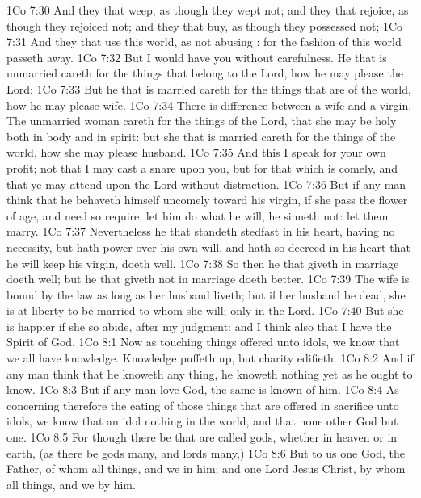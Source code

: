\vs 1Co 7:30 And they that weep, as though they wept not; and they that rejoice, as though they rejoiced not; and they that buy, as though they possessed not;
\vs 1Co 7:31 And they that use this world, as not abusing : for the fashion of this world passeth away.
\vs 1Co 7:32 But I would have you without carefulness. He that is unmarried careth for the things that belong to the Lord, how he may please the Lord:
\vs 1Co 7:33 But he that is married careth for the things that are of the world, how he may please  wife.
\vs 1Co 7:34 There is difference  between a wife and a virgin. The unmarried woman careth for the things of the Lord, that she may be holy both in body and in spirit: but she that is married careth for the things of the world, how she may please  husband.
\vs 1Co 7:35 And this I speak for your own profit; not that I may cast a snare upon you, but for that which is comely, and that ye may attend upon the Lord without distraction.
\vs 1Co 7:36 But if any man think that he behaveth himself uncomely toward his virgin, if she pass the flower of  age, and need so require, let him do what he will, he sinneth not: let them marry.
\vs 1Co 7:37 Nevertheless he that standeth stedfast in his heart, having no necessity, but hath power over his own will, and hath so decreed in his heart that he will keep his virgin, doeth well.
\vs 1Co 7:38 So then he that giveth  in marriage doeth well; but he that giveth  not in marriage doeth better.
\vs 1Co 7:39 The wife is bound by the law as long as her husband liveth; but if her husband be dead, she is at liberty to be married to whom she will; only in the Lord.
\vs 1Co 7:40 But she is happier if she so abide, after my judgment: and I think also that I have the Spirit of God.
\vs 1Co 8:1 Now as touching things offered unto idols, we know that we all have knowledge. Knowledge puffeth up, but charity edifieth.
\vs 1Co 8:2 And if any man think that he knoweth any thing, he knoweth nothing yet as he ought to know.
\vs 1Co 8:3 But if any man love God, the same is known of him.
\vs 1Co 8:4 As concerning therefore the eating of those things that are offered in sacrifice unto idols, we know that an idol  nothing in the world, and that  none other God but one.
\vs 1Co 8:5 For though there be that are called gods, whether in heaven or in earth, (as there be gods many, and lords many,)
\vs 1Co 8:6 But to us  one God, the Father, of whom  all things, and we in him; and one Lord Jesus Christ, by whom  all things, and we by him.
